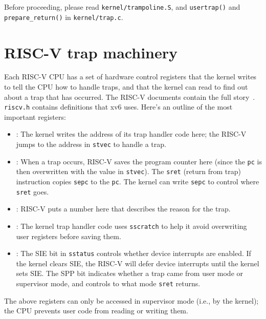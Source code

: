 Before proceeding, please read {\tt kernel/trampoline.S},
and {\tt usertrap()} and {\tt prepare\_return()} in {\tt kernel/trap.c}.

\section{RISC-V trap machinery}

Each RISC-V CPU has a set of hardware control registers that the kernel writes to
tell the CPU how to handle traps, and that the kernel can read
to find out about a trap that has occurred. The RISC-V documents
contain the full story~\cite{riscv:priv}. {\tt riscv.h}
 contains definitions that xv6 uses. Here's
an outline of the most important registers:

\begin{itemize}

\item {}: The kernel writes the address of its trap handler
  code here; the RISC-V jumps to the address in {\tt stvec} to handle a trap.

\item {}: When a trap occurs, RISC-V saves the program counter
  here (since the {\tt pc} is then overwritten with the
  value in {\tt stvec}). The
  {\tt sret} (return from trap) instruction copies {\tt sepc} to the
  {\tt pc}. The kernel can write {\tt sepc} to control where {\tt
    sret} goes.

\item {}: RISC-V puts a number here that describes
the reason for the trap.

\item {}: The kernel trap handler code uses {\tt sscratch}
  to help it avoid overwriting user registers before saving them.

\item {}: The SIE bit in {\tt sstatus}
  controls whether device interrupts
  are enabled. If the kernel clears SIE, the RISC-V will defer
  device interrupts until the kernel sets SIE. The SPP bit
  indicates whether a trap came from user mode or supervisor
  mode, and controls to what mode {\tt sret} returns.

\end{itemize}

The above registers can only be accessed in supervisor mode (i.e., by
the kernel); the CPU prevents user code from reading or writing them.

